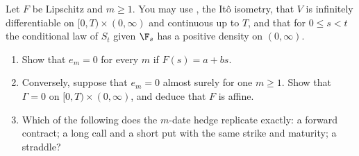 
\begin{exercise}\label{ex:hd-exact-hedge}
\easy Let $F$ be Lipschitz and $m\ge1$. You may use , the It\^o
isometry, that $V$ is infinitely differentiable on $[0,T)\times(0,\infty)$ and continuous up to
$T$, and that for $0\le s<t$ the conditional law of $S_t$ given $\F_s$ has a positive density on
$(0,\infty)$.
\begin{enumerate}[label=(\alph*)]
  \item Show that $e_m=0$ for every $m$ if $F(s)=a+bs$.
  \item Conversely, suppose that $e_m=0$ almost surely for one $m\ge1$. Show that
    $\Gamma=0$ on $[0,T)\times(0,\infty)$, and deduce that $F$ is affine.
  \item Which of the following does the $m$-date hedge replicate exactly: a forward contract; a
    long call and a short put with the same strike and maturity; a straddle?
\end{enumerate}
\end{exercise}

